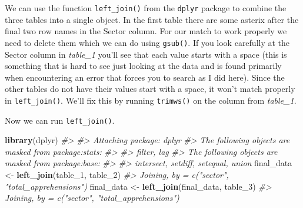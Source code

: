 \documentclass[
  12pt,
]{book}
\newenvironment{Shaded}{\begin{snugshade}}{\end{snugshade}}
\newcommand{\CharTok}[1]{\textcolor[rgb]{0.5,0.5,0.5}{#1}}
\newcommand{\CommentTok}[1]{\textcolor[rgb]{0.37,0.37,0.37}{\textit{#1}}}
\newcommand{\DecValTok}[1]{\textcolor[rgb]{0.06,0.06,0.06}{#1}}
\newcommand{\KeywordTok}[1]{\textcolor[rgb]{0.27,0.27,0.27}{\textbf{#1}}}
\newcommand{\NormalTok}[1]{#1}
\newcommand{\OperatorTok}[1]{\textcolor[rgb]{0.43,0.43,0.43}{\textbf{#1}}}
\newcommand{\StringTok}[1]{\textcolor[rgb]{0.5,0.5,0.5}{#1}}
\begin{document}
We can use the function \texttt{left\_join()} from the \texttt{dplyr} package to combine the three tables into a single object. In the first table there are some asterix after the final two row names in the Sector column. For our match to work properly we need to delete them which we can do using \texttt{gsub()}. If you look carefully at the Sector column in \emph{table\_1} you'll see that each value starts with a space (this is something that is hard to see just looking at the data and is found primarily when encountering an error that forces you to search as I did here). Since the other tables do not have their values start with a space, it won't match properly in \texttt{left\_join()}. We'll fix this by running \texttt{trimws()} on the column from \emph{table\_1}.

\begin{Shaded}
\end{Shaded}

Now we can run \texttt{left\_join()}.

\begin{Shaded}
\begin{Highlighting}[]
\KeywordTok{library}\NormalTok{(dplyr)}
\CommentTok{\#> }
\CommentTok{\#> Attaching package: \textquotesingle{}dplyr\textquotesingle{}}
\CommentTok{\#> The following objects are masked from \textquotesingle{}package:stats\textquotesingle{}:}
\CommentTok{\#> }
\CommentTok{\#>     filter, lag}
\CommentTok{\#> The following objects are masked from \textquotesingle{}package:base\textquotesingle{}:}
\CommentTok{\#> }
\CommentTok{\#>     intersect, setdiff, setequal, union}
\NormalTok{final\_data <{-}}\StringTok{ }\KeywordTok{left\_join}\NormalTok{(table\_}\DecValTok{1}\NormalTok{, table\_}\DecValTok{2}\NormalTok{)}
\CommentTok{\#> Joining, by = c("sector", "total\_apprehensions")}
\NormalTok{final\_data <{-}}\StringTok{ }\KeywordTok{left\_join}\NormalTok{(final\_data, table\_}\DecValTok{3}\NormalTok{)}
\CommentTok{\#> Joining, by = c("sector", "total\_apprehensions")}
\end{Highlighting}
\end{Shaded}
\end{document}
